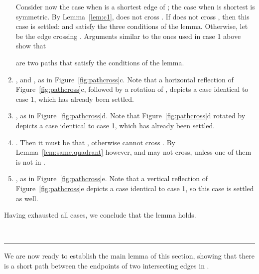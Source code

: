 \pdfoutput=1  \documentclass[11pt]{article}
\newcommand{\qed}{\rule{0.5em}{1.5ex}}
\newcommand{\fqed}{{\hfill~\qed}}
\newenvironment{proof}{{\noindent \bf Proof.}}
                      {{\hfill \fqed} \vspace{1em}}
\begin{document}
\begin{proof}
\begin{enumerate}
Consider now the case when  is a shortest edge of ; the case
when  is shortest is symmetric.
By
Lemma~\ref{lem:c1},
 does not cross .
If  does not cross , then this case is settled:
 and  satisfy the three conditions
of the lemma. Otherwise, let 
be the edge crossing . Arguments similar to the ones used in case 1 above show that

are two paths that satisfy the conditions of the lemma.

\item , and , as in Figure~\ref{fig:pathcross}c.
Note that a horizontal reflection of Figure~\ref{fig:pathcross}c, followed
by a rotation of , depicts a case identical to case 1, which has
already been settled.

\item , as in Figure~\ref{fig:pathcross}d.
Note that Figure~\ref{fig:pathcross}d rotated by  depicts
a case identical to case 1, which has already been settled.

\item . Then it must be that , otherwise
 cannot cross . By Lemma~\ref{lem:same.quadrant} however,
 and  may not cross, unless one of them is not in .

\item , as in Figure~\ref{fig:pathcross}e.
Note that a vertical reflection of Figure~\ref{fig:pathcross}e depicts
a case identical to case 1, so this case is settled as well.
\end{enumerate}
Having exhausted all cases, we conclude that the lemma holds.
\end{proof}

\noindent
We are now ready to establish the main lemma of this section, showing
that there is a short path between the endpoints of two intersecting
edges in .
\end{document}
